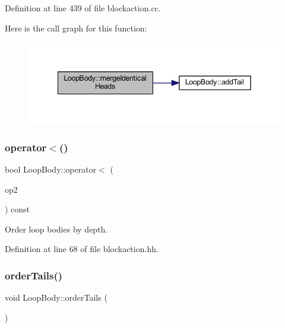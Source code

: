 Definition at line 439 of file blockaction.\+cc.

Here is the call graph for this function\+:
\nopagebreak
\begin{figure}[H]
\begin{center}
\leavevmode
\includegraphics[width=342pt]{class_loop_body_a4f29c37ed94852f51302cbd3c0a9f85c_cgraph}
\end{center}
\end{figure}
\mbox{\label{class_loop_body_af8f3e56db4ab58db9b4fab093a23c90c}} 
\subsubsection{\texorpdfstring{operator$<$()}{operator<()}}
{\footnotesize\ttfamily bool Loop\+Body\+::operator$<$ (\begin{DoxyParamCaption}\item[{const \mbox{\hyperlink{class_loop_body}{Loop\+Body}} \&}]{op2 }\end{DoxyParamCaption}) const\hspace{0.3cm}{\ttfamily [inline]}}



Order loop bodies by depth. 



Definition at line 68 of file blockaction.\+hh.

\mbox{\label{class_loop_body_a43635dafd8293567ca13c10be0aead6f}} 
\subsubsection{\texorpdfstring{orderTails()}{orderTails()}}
{\footnotesize\ttfamily void Loop\+Body\+::order\+Tails (\begin{DoxyParamCaption}\item[{void}]{ }\end{DoxyParamCaption})}



